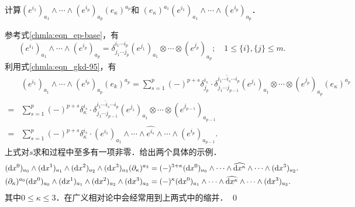 \begin{example}\label{chdf:exam_eiapk}
	计算$(e^{i_1})_{a_1} \wedge \cdots \wedge (e^{i_p})_{a_p} (e_\kappa)^{a_p}$和
	$(e_\kappa)^{a_1} (e^{i_1})_{a_1} \wedge \cdots \wedge (e^{i_p})_{a_p} $．
\end{example}
参考式\eqref{chmla:eqn_ep-base}，有
\begin{equation*} %
	(e^{i_1})_{a_1} \wedge \cdots \wedge (e^{i_p})_{a_p}
	= \delta^{i_1 \cdots i_p}_{j_1 \cdots j_p}
	(e^{j_1})_{a_1}  \otimes	\cdots \otimes (e^{j_p})_{a_p} ;
	\quad 1\leqslant \{i\},  \{j\}  \leqslant m .
\end{equation*}
利用式\eqref{chmla:eqn_gkd-95}，有
\begin{align*}
	&(e^{i_1})_{a_1} \wedge \cdots \wedge (e^{i_p})_{a_p} (e_k)^{a_p} = 
	\sum_{s=1}^{p} (-)^{p+s} \delta_{j_p}^{i_s} \cdot
	\delta_{j_1 \cdots  j_{p-1}}^{i_1 \cdots\hat{i}_s \cdots i_{p}}
	(e^{j_1})_{a_1}  \otimes	\cdots \otimes (e^{j_p})_{a_p} (e_\kappa)^{a_p} \\
	=&\sum_{s=1}^{p} (-)^{p+s} \delta_{\kappa}^{i_s} \cdot
	\delta_{j_1 \cdots  j_{p-1}}^{i_1 \cdots\hat{i}_s \cdots i_{p}} 
	(e^{j_1})_{a_1}  \otimes	\cdots \otimes (e^{j_{p-1}})_{a_{p-1}} \\
	=& \sum_{s=1}^{p} (-)^{p+s} \delta_{\kappa}^{i_s} \cdot
	(e^{i_1})_{a_1} \wedge\cdots \wedge \widehat{e^{i_s}}
	\wedge \cdots \wedge (e^{i_p})_{a_{p-1}} .
\end{align*}
上式对$s$求和过程中至多有一项非零．给出两个具体的示例．
\setlength{\mathindent}{0em}
\begin{align*}
	&({\rm d}x^{0})_{a_{0}} \wedge({\rm d}x^{1})_{a_{1}}\wedge({\rm d}x^{2})_{a_{2}}
	\wedge ({\rm d}x^{3})_{a_{3}} (\partial_\kappa)^{a_3}
	=(-)^{3+\kappa} ({\rm d}x^{0})_{a_{0}} \wedge\cdots \wedge \widehat{{\rm d}{x}^{\kappa}}
	\wedge \cdots \wedge ({\rm d}x^{3})_{a_{2}} . \\
	& (\partial_\kappa)^{a_0} ({\rm d}x^{0})_{a_{0}} \wedge({\rm d}x^{1})_{a_{1}}
	\wedge({\rm d}x^{2})_{a_{2}}	\wedge ({\rm d}x^{3})_{a_{3}} 
	=(-)^{\kappa} ({\rm d}x^{0})_{a_{1}} \wedge\cdots \wedge \widehat{{\rm d}{x}^{\kappa}}
	\wedge \cdots \wedge ({\rm d}x^{3})_{a_{3}} . 
\end{align*}\setlength{\mathindent}{2em}
其中$0\leqslant \kappa \leqslant 3$．在广义相对论中会经常用到上两式中的缩并．
\qed



